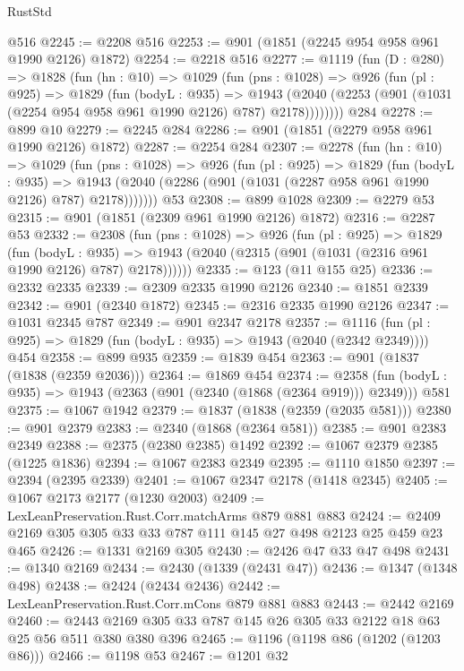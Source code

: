 \begin{lexlean}{RustStd}
\begin{coremodule}
{\begin{coremodule}
{{{{{{{{{{{{{{    @516
@2245 := @2208 @516
@2253 := @901 (@1851 (@2245 @954 @958 @961 @1990 @2126) @1872)
@2254 := @2218 @516
@2277 := @1119
    (fun (D : @280) =>
    @1828
      (fun (hn : @10) =>
      @1029
        (fun (pns : @1028) =>
        @926
          (fun (pl : @925) =>
          @1829
            (fun (bodyL : @935) =>
            @1943 (@2040 (@2253 (@901 (@1031 (@2254 @954 @958 @961 @1990 @2126) @787) @2178))))))))
    @284
@2278 := @899 @10
@2279 := @2245 @284
@2286 := @901 (@1851 (@2279 @958 @961 @1990 @2126) @1872)
@2287 := @2254 @284
@2307 := @2278
    (fun (hn : @10) =>
    @1029
      (fun (pns : @1028) =>
      @926
        (fun (pl : @925) =>
        @1829
          (fun (bodyL : @935) =>
          @1943 (@2040 (@2286 (@901 (@1031 (@2287 @958 @961 @1990 @2126) @787) @2178)))))))
    @53
@2308 := @899 @1028
@2309 := @2279 @53
@2315 := @901 (@1851 (@2309 @961 @1990 @2126) @1872)
@2316 := @2287 @53
@2332 := @2308
    (fun (pns : @1028) =>
    @926
      (fun (pl : @925) =>
      @1829
        (fun (bodyL : @935) =>
        @1943 (@2040 (@2315 (@901 (@1031 (@2316 @961 @1990 @2126) @787) @2178))))))
@2335 := @123 (@11 @155 @25)
@2336 := @2332 @2335
@2339 := @2309 @2335 @1990 @2126
@2340 := @1851 @2339
@2342 := @901 (@2340 @1872)
@2345 := @2316 @2335 @1990 @2126
@2347 := @1031 @2345 @787
@2349 := @901 @2347 @2178
@2357 := @1116 (fun (pl : @925) => @1829 (fun (bodyL : @935) => @1943 (@2040 (@2342 @2349)))) @454
@2358 := @899 @935
@2359 := @1839 @454
@2363 := @901 (@1837 (@1838 (@2359 @2036)))
@2364 := @1869 @454
@2374 := @2358 (fun (bodyL : @935) => @1943 (@2363 (@901 (@2340 (@1868 (@2364 @919))) @2349))) @581
@2375 := @1067 @1942
@2379 := @1837 (@1838 (@2359 (@2035 @581)))
@2380 := @901 @2379
@2383 := @2340 (@1868 (@2364 @581))
@2385 := @901 @2383 @2349
@2388 := @2375 (@2380 @2385) @1492
@2392 := @1067 @2379 @2385 (@1225 @1836)
@2394 := @1067 @2383 @2349
@2395 := @1110 @1850
@2397 := @2394 (@2395 @2339)
@2401 := @1067 @2347 @2178 (@1418 @2345)
@2405 := @1067 @2173 @2177 (@1230 @2003)
@2409 := LexLeanPreservation.Rust.Corr.matchArms @879 @881 @883
@2424 := @2409 @2169 @305 @305 @33 @33 @787 @111 @145 @27 @498 @2123 @25 @459 @23 @465
@2426 := @1331 @2169 @305
@2430 := @2426 @47 @33 @47 @498
@2431 := @1340 @2169
@2434 := @2430 (@1339 (@2431 @47))
@2436 := @1347 (@1348 @498)
@2438 := @2424 (@2434 @2436)
@2442 := LexLeanPreservation.Rust.Corr.mCons @879 @881 @883
@2443 := @2442 @2169
@2460 := @2443 @2169 @305 @33 @787 @145 @26 @305 @33 @2122 @18 @63 @25 @56 @511 @380 @380 @396
@2465 := @1196 (@1198 @86 (@1202 (@1203 @86)))
@2466 := @1198 @53
@2467 := @1201 @32
}}}}}}}}}}}}}}
\end{coremodule}}
\end{coremodule}
\end{lexlean}
